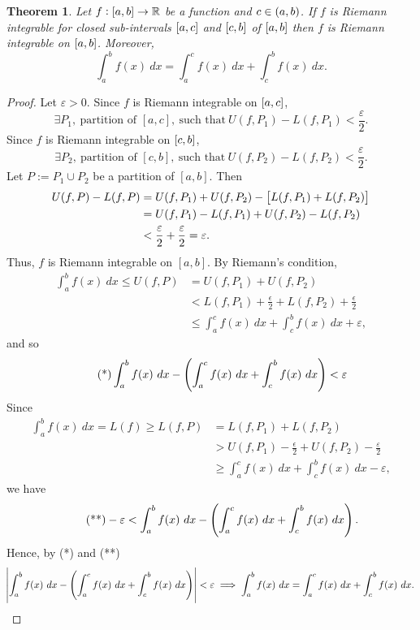 \documentclass[12pt,openany]{book}
\newtheorem{theorem}{Theorem}[chapter]
\theoremstyle{definition}
\newcommand{\R}{\mathbb{R}}
\begin{document}
	\newpage
	\begin{tcolorbox}[colframe=thmcolor, title={\color{white}\bf }]
		\begin{theorem}
			Let $f:\intcc{a,b}\to\R$ be a function and $c\in\intoo{a,b}$. If $f$ is Riemann integrable for closed sub-intervals \(\intcc{a,c}\) and $\intcc{c,b}$ of $\intcc{a,b}$ then $f$ is Riemann integrable on $\intcc{a,b}$. Moreover, \[
			\int_a^bf(x)\ dx=\int_a^cf(x)\ dx+\int_c^bf(x)\ dx.
			\]
		\end{theorem}
	\end{tcolorbox}
	\begin{proof}
		Let $\varepsilon>0$. Since $f$ is Riemann integrable on $\intcc{a,c}$, \[
		\exists P_1,\ \text{partition of $[a,c]$},\ \text{such that}\ U(f,P_1)-L(f,P_1)<\frac{\varepsilon}{2}.
		\] Since $f$ is Riemann integrable on $\intcc{c,b}$, \[
		\exists P_2,\ \text{partition of $[c,b]$},\ \text{such that}\ U(f,P_2)-L(f,P_2)<\frac{\varepsilon}{2}.
		\] Let $P:=P_1\cup P_2$ be a partition of $[a,b]$. Then \begin{align*}
			U(f,P)-L(f,P)&=U(f,P_1)+U(f,P_2)-\sbr{L(f,P_1)+L(f,P_2)}\\
			&=U(f,P_1)-L(f,P_1)+U(f,P_2)-L(f,P_2)\\
			&<\frac{\varepsilon}{2}+\frac{\varepsilon}{2}=\varepsilon.
		\end{align*} Thus, $f$ is Riemann integrable on $[a,b]$.
		By Riemann's condition,
		\begin{align*}
			\int_a^bf(x)\ dx\leq U(f,P)&=U(f,P_1)+U(f,P_2)\\
			&<L(f,P_1)+\frac{\epsilon}{2}+L(f,P_2)+\frac{\epsilon}{2}\\
			&\leq \int_a^cf(x)\ dx + \int_c^bf(x)\ dx +\varepsilon,
		\end{align*} and so
		\begin{equation*}\tag{*}
			\int_a^bf(x)\ dx-\del{\int_a^cf(x)\ dx + \int_c^bf(x)\ dx}<\varepsilon
		\end{equation*}
		Since \begin{align*}
			\int_a^bf(x)\ dx = L(f)\geq L(f,P)&=L(f,P_1)+L(f,P_2)\\
			&>U(f,P_1)-\frac{\epsilon}{2}+U(f,P_2)-\frac{\varepsilon}{2}\\
			&\geq \int_a^cf(x)\ dx+\int_c^bf(x)\ dx -\varepsilon,
		\end{align*} we have \begin{equation*}\tag{**}
			-\varepsilon<\int_a^bf(x)\ dx-\del{\int_a^cf(x)\ dx + \int_c^bf(x)\ dx}.
		\end{equation*}
		Hence, by (*) and (**) \[
		\abs{\int_a^bf(x)\ dx-\del{\int_a^cf(x)\ dx + \int_c^bf(x)\ dx}}<\varepsilon\implies\int_a^bf(x)\ dx=\int_a^cf(x)\ dx + \int_c^bf(x)\ dx.
		\]
	\end{proof}
	
\end{document}
